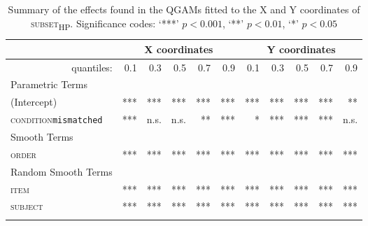 \begin{table}[H]\fontsize{9}{10}
\caption{Summary of the effects found in the QGAMs fitted to the X and Y coordinates of \textsc{subset\textsubscript{HP}}. Significance codes: `***' $p < 0.001$, `**' $p < 0.01$, `*' $p < 0.05$}
\label{tab:8.7}
\centering
\begin{tabular}{lrrrrrrrrrr}
\lsptoprule
~                   & \multicolumn{5}{c}{X coordinates}                              & \multicolumn{5}{c}{Y coordinates}                               \\
\midrule
\multicolumn{1}{r}{quantiles:}          & 0.1        & 0.3        & 0.5        & 0.7        & 0.9        & 0.1        & 0.3        & 0.5        & 0.7        & 0.9         \\
\midrule
Parametric Terms    & \textbf{~} & \textbf{~} & \textbf{~} & \textbf{~} & \textbf{~} & \textbf{~} & \textbf{~} & \textbf{~} & \textbf{~} & \textbf{~}  \\
\midrule
(Intercept)         & ***        & ***        & ***        & ***        & ***        & ***        & ***        & ***        & ***        & **          \\
\textsc{condition}\texttt{mismatched} & ***       & n.s.          & n.s.        & **        & ***        & *       & ***        & ***        & ***        & n.s.         \\
\midrule
Smooth Terms        & \textbf{~} & \textbf{~} & \textbf{~} & \textbf{~} & \textbf{~} & \textbf{~} & \textbf{~} & \textbf{~} & \textbf{~} & \textbf{~}  \\
\midrule
\textsc{order}               & ***        & ***        & ***        & ***        & ***        & ***        & ***        & ***        & ***        & ***         \\
\midrule
Random Smooth Terms & \textbf{~} & \textbf{~} & \textbf{~} & \textbf{~} & \textbf{~} & \textbf{~} & \textbf{~} & \textbf{~} & \textbf{~} & \textbf{~}  \\
\midrule
\textsc{item}                & ***        & ***        & ***        & ***        & ***        & ***        & ***        & ***        & ***        & ***         \\
\textsc{subject}             & ***        & ***        & ***        & ***        & ***        & ***        & ***        & ***        & ***        & ***        \\
\lspbottomrule
\end{tabular}
\end{table}



